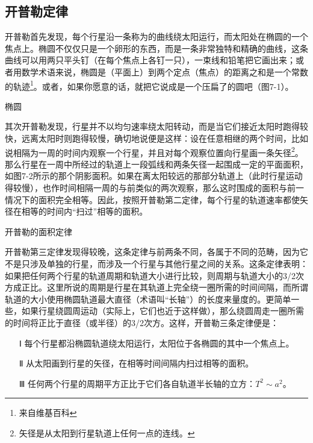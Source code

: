 \documentclass[12pt,oneside]{book}
\begin{document}
\begin{common-format}
\section{开普勒定律}
开普勒首先发现，每个行星沿一条称为的曲线绕太阳运行，而太阳处在椭圆的一个焦点上。椭圆不仅仅只是一个卵形的东西，而是一条非常独特和精确的曲线，这条曲线可以用两只平头钉（在每个焦点上各钉一只），一束线和铅笔把它画出来；或者用数学术语来说，椭圆是（平面上）到两个定点（焦点）的距离之和是一个常数的轨迹\footnote{来自维基百科}。或者，如果你愿意的话，就把它说成是一个压扁了的圆吧（图7-1）。
\begin{fig}{椭圆}
\caption{椭圆}
\label{fig:椭圆}
\end{fig}

其次开普勒发现，行星并不以均匀速率绕太阳转动，而是当它们接近太阳时跑得较快，远离太阳时则跑得较慢，确切地说便是这样：设在任意相继的两个时间，比如说相隔为一周的时间内观察一个行星，并且对每个观察位置向行星画一条矢径\footnote{矢径是从太阳到行星轨道上任何一点的连线。}。那么行星在一周中所经过的轨道上一段弧线和两条矢径一起围成一定的平面面积，如图7-2所示的那个阴影面积。如果在离太阳较远的那部分轨道上（此时行星运动得较慢），也作时间相隔一周的与前类似的两次观察，那么这时围成的面积与前一情况下的面积完全相等。因此，按照开普勒第二定律，每个行星的轨道速率都使矢径在相等的时间内“扫过”相等的面积。
\begin{fig}{开普勒的面积定律}
\caption{开普勒的面积定律}
\label{fig:开普勒的面积定律}
\end{fig}

开普勒第三定律发现得较晚，这条定律与前两条不同，各属于不同的范畴，因为它不是只涉及单独的行星，而涉及一个行星与其他行星之间的关系。这条定律表明：如果把任何两个行星的轨道周期和轨道大小进行比较，则周期与轨道大小的3/2次方成正比。这里所说的周期是行星在其轨道上完全绕一圈所需的时间间隔，而所谓轨道的大小使用椭圆轨道最大直径（术语叫“长轴”）的长度来量度的。更简单一些，如果行星绕圆周运动（实际上，它们也近于这样做），那么绕圆周走一圈所需的时间将正比于直径（或半径）的3/2次方。这样，开普勒三条定律便是：
\begin{enumerate}
\item[Ⅰ] 每个行星都沿椭圆轨道绕太阳运行，太阳位于各椭圆的其中一个焦点上。
\item[Ⅱ] 从太阳画到行星的矢径，在相等时间间隔内扫过相等的面积。
\item[Ⅲ] 任何两个行星的周期平方正比于它们各自轨道半长轴的立方：$T^2\sim a^2$。
\end{enumerate}



\end{common-format}
\end{document}

